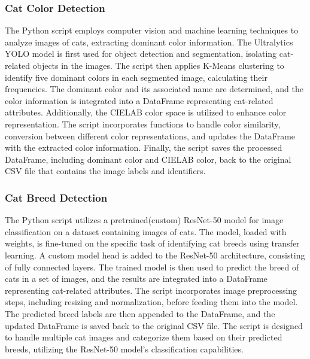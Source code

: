 \documentclass[conference]{IEEEtran}
\begin{document}
\subsubsection{Cat Color Detection}
\begin{itemize}
    \subitem The Python script employs computer vision and machine learning techniques to analyze images of cats, extracting dominant color information. The Ultralytics YOLO model is first used for object detection and segmentation, isolating cat-related objects in the images. The script then applies K-Means clustering to identify five dominant colors in each segmented image, calculating their frequencies. The dominant color and its associated name are determined, and the color information is integrated into a DataFrame representing cat-related attributes. Additionally, the CIELAB color space is utilized to enhance color representation. The script incorporates functions to handle color similarity, conversion between different color representations, and updates the DataFrame with the extracted color information. Finally, the script saves the processed DataFrame, including dominant color and CIELAB color, back to the original CSV file that contains the image labels and identifiers. \\
\end{itemize}

\subsubsection{Cat Breed Detection}
\begin{itemize}
    \subitem The Python script utilizes a pretrained(custom) ResNet-50 model for image classification on a dataset containing images of cats. The model, loaded with weights, is fine-tuned on the specific task of identifying cat breeds using transfer learning. A custom model head is added to the ResNet-50 architecture, consisting of fully connected layers. The trained model is then used to predict the breed of cats in a set of images, and the results are integrated into a DataFrame representing cat-related attributes. The script incorporates image preprocessing steps, including resizing and normalization, before feeding them into the model. The predicted breed labels are then appended to the DataFrame, and the updated DataFrame is saved back to the original CSV file. The script is designed to handle multiple cat images and categorize them based on their predicted breeds, utilizing the ResNet-50 model's classification capabilities. \\
\end{itemize}
\end{document}
